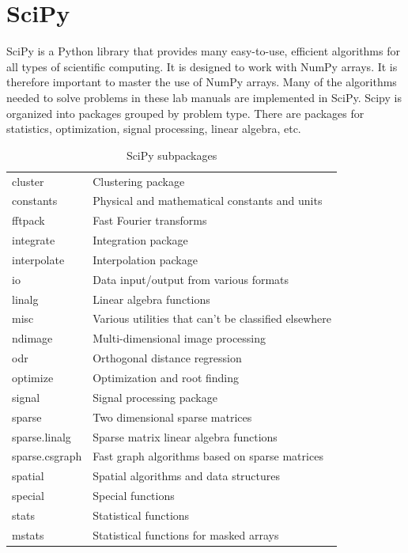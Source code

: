 \section*{SciPy}
SciPy is a Python library that provides many easy-to-use, efficient algorithms for all types of scientific computing.
It is designed to work with NumPy arrays.
It is therefore important to master the use of NumPy arrays.
Many of the algorithms needed to solve problems in these lab manuals are implemented in SciPy.
Scipy is organized into packages grouped by problem type.
There are packages for statistics, optimization, signal processing, linear algebra, etc.
\begin{table}[h]
\centering
\begin{tabular}{|l|l|}
\hline
cluster & Clustering package \\
constants & Physical and mathematical constants and units \\
fftpack & Fast Fourier transforms \\
integrate & Integration package \\
interpolate & Interpolation package \\
io & Data input/output from various formats \\
linalg & Linear algebra functions \\
misc & Various utilities that can't be classified elsewhere \\
ndimage & Multi-dimensional image processing \\ 
odr & Orthogonal distance regression \\
optimize & Optimization and root finding \\
signal & Signal processing package \\
sparse & Two dimensional sparse matrices \\
sparse.linalg & Sparse matrix linear algebra functions \\
sparse.csgraph & Fast graph algorithms based on sparse matrices \\
spatial & Spatial algorithms and data structures \\ 
special & Special functions \\ 
stats & Statistical functions \\
mstats & Statistical functions for masked arrays \\
\hline
\end{tabular}
\caption{SciPy subpackages}
\end{table}

